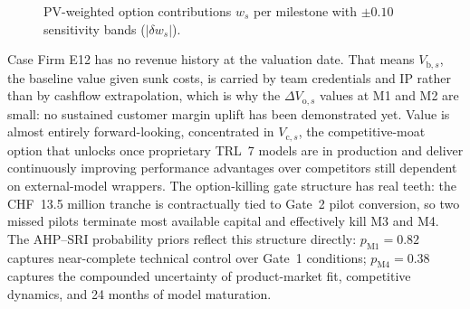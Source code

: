 \documentclass[oneside,10pt]{swissi}
\begin{document}
\begin{figure}[htbp]
\centering
{}
\caption{PV-weighted option contributions $w_s$ per milestone with $\pm 0.10$ sensitivity bands ($|\delta w_s|$).}
\label{fig:firmE12-sensitivity}
\end{figure}

Case Firm E12 has no revenue history at the valuation date. That means $V_{\mathrm{b},s}$, the baseline value given sunk costs, is carried by team credentials and IP rather than by cashflow extrapolation, which is why the $\Delta V_{\mathrm{o},s}$ values at M1 and M2 are small: no sustained customer margin uplift has been demonstrated yet. Value is almost entirely forward-looking, concentrated in $V_{\mathrm{c},s}$, the competitive-moat option that unlocks once proprietary TRL~7 models are in production and deliver continuously improving performance advantages over competitors still dependent on external-model wrappers. The option-killing gate structure has real teeth: the CHF~13.5 million tranche is contractually tied to Gate~2 pilot conversion, so two missed pilots terminate most available capital and effectively kill M3 and M4. The AHP--SRI probability priors reflect this structure directly: $p_{\mathrm{M1}} = 0.82$ captures near-complete technical control over Gate~1 conditions; $p_{\mathrm{M4}} = 0.38$ captures the compounded uncertainty of product-market fit, competitive dynamics, and 24 months of model maturation.
\end{document}
